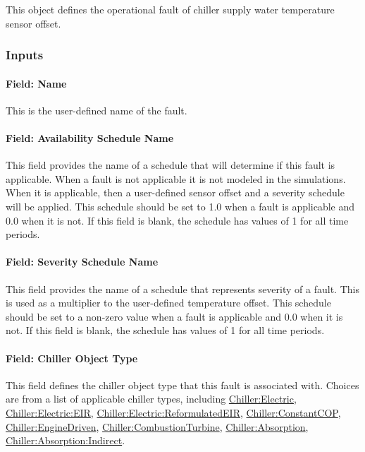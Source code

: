 This object defines the operational fault of chiller supply water temperature sensor offset.

\subsubsection{Inputs}

\paragraph{Field: Name}

This is the user-defined name of the fault.

\paragraph{Field: Availability Schedule Name}

This field provides the name of a schedule that will determine if this fault is applicable. When a fault is not applicable it is not modeled in the simulations. When it is applicable, then a user-defined sensor offset and a severity schedule will be applied. This schedule should be set to 1.0 when a fault is applicable and 0.0 when it is not. If this field is blank, the schedule has values of 1 for all time periods.

\paragraph{Field: Severity Schedule Name}\label{field-severity-schedule-name}

This field provides the name of a schedule that represents severity of a fault. This is used as a multiplier to the user-defined temperature offset. This schedule should be set to a non-zero value when a fault is applicable and 0.0 when it is not. If this field is blank, the schedule has values of 1 for all time periods.

\paragraph{Field: Chiller Object Type}\label{field-chiller-object-type}

This field defines the chiller object type that this fault is associated with. Choices are from a list of applicable chiller types, including \hyperref[chillerelectric]{Chiller:Electric}, \hyperref[chillerelectriceir]{Chiller:Electric:EIR}, \hyperref[chillerelectricreformulatedeir]{Chiller:Electric:ReformulatedEIR},  \hyperref[chillerconstantcop]{Chiller:ConstantCOP}, \hyperref[chillerenginedriven]{Chiller:EngineDriven}, \hyperref[chillercombustionturbine]{Chiller:CombustionTurbine}, \hyperref[chillerabsorption]{Chiller:Absorption}, \hyperref[chillerabsorptionindirect]{Chiller:Absorption:Indirect}.

